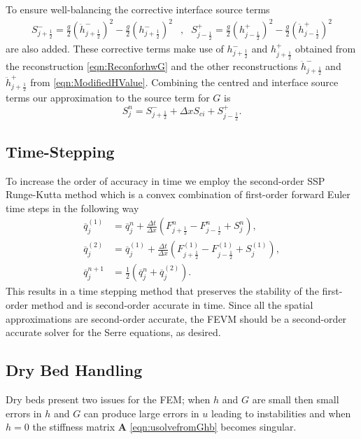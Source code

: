 \documentclass[times]{elsarticle}
\newcommand{\matr}[1]{\mathbf{#1}}
\begin{document}
To ensure well-balancing the corrective interface source terms
\begin{align*}
S^{-}_{j + \frac{1}{2}} =  \frac{g}{2} \left(\ddot{h}^{-}_{j + \frac{1}{2}} \right)^2 - \frac{g}{2} \left(h^{-}_{j + \frac{1}{2}} \right)^2&,&
S^{+}_{j - \frac{1}{2}} =  \frac{g}{2} \left(h^{+}_{j - \frac{1}{2}}\right)^2 - \frac{g}{2}\left(\ddot{h}^{+}_{j - \frac{1}{2}}\right)^2 
\end{align*}
are also added. These corrective terms make use of $h^{-}_{j + \frac{1}{2}}$ and $h^{+}_{j + \frac{1}{2}}$ obtained from the reconstruction \eqref{eqn:ReconforhwG} and the other reconstructions $\ddot{h}^{-}_{j + \frac{1}{2}}$ and $\ddot{h}^{+}_{j + \frac{1}{2}}$ from \eqref{eqn:ModifiedHValue}. Combining the centred and interface source terms our approximation to the source term for $G$ is 
\begin{equation*}
S^n_j =   S^{-}_{j + \frac{1}{2}} + \Delta x S_{ci} + S^{+}_{j - \frac{1}{2}}.
\end{equation*}

\subsection{Time-Stepping}
To increase the order of accuracy in time we employ the second-order SSP Runge-Kutta method \cite{Gottlieb-etal-2003-89} which is a convex combination of first-order forward Euler time steps in the following way
\begin{subequations}
	\begin{align}
	\overline{q}_j^{(1)} &= \overline{q}^{n}_j + \frac{\Delta t}{\Delta x} \left(F^n_{j+\frac{1}{2}} - F^n_{j-\frac{1}{2}} + S^n_j\right),\\
	\overline{q}_j^{(2)} &= \overline{q}_j^{(1)} + \frac{\Delta t}{\Delta x} \left(F_{j+\frac{1}{2}}^{(1)} - F_{j-\frac{1}{2}}^{(1)}  + S_j^{(1)} \right), \\
	\overline{q}^{n+1}_j &= \frac{1}{2} \left( \overline{q}^n_j +  \overline{q}_j^{(2)}  \right).
	\end{align}
	\label{eqn:SSPRKStep1}
\end{subequations}
This results in a time stepping method that preserves the stability of the first-order method and is second-order accurate in time. Since all the spatial approximations are second-order accurate, the FEVM should be a second-order accurate solver for the Serre equations, as desired. 


\subsection{Dry Bed Handling}
Dry beds present two issues for the FEM; when $h$ and $G$ are small then small errors in $h$ and $G$ can produce large errors in $u$ leading to instabilities and when $h=0$ the stiffness matrix $\matr{A}$ \eqref{eqn:usolvefromGhb} becomes singular.
\end{document}
